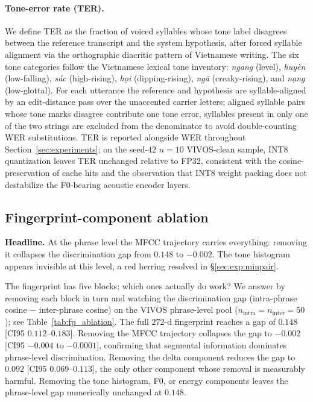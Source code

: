 \documentclass[a4paper,fleqn]{cas-dc}
\begin{document}
\paragraph{Tone-error rate (TER).} We define TER as the fraction of voiced syllables whose tone label disagrees between the reference transcript and the system hypothesis, after forced syllable alignment via the orthographic diacritic pattern of Vietnamese writing. The six tone categories follow the Vietnamese lexical tone inventory: \emph{ngang} (level), \emph{huy\`en} (low-falling), \emph{s\'ac} (high-rising), \emph{h\d{o}i} (dipping-rising), \emph{ng\~a} (creaky-rising), and \emph{n\d{a}ng} (low-glottal). For each utterance the reference and hypothesis are syllable-aligned by an edit-distance pass over the unaccented carrier letters; aligned syllable pairs whose tone marks disagree contribute one tone error, syllables present in only one of the two strings are excluded from the denominator to avoid double-counting WER substitutions. TER is reported alongside WER throughout Section~\ref{sec:experiments}; on the seed-$42$ $n=10$ VIVOS-clean sample, INT8 quantization leaves TER unchanged relative to FP32, consistent with the cosine-preservation of cache hits and the observation that INT8 weight packing does not destabilize the F0-bearing acoustic encoder layers.

\subsection{Fingerprint-component ablation}\label{sec:exp:ablation}
\textbf{Headline.} At the phrase level the MFCC trajectory carries everything: removing it collapses the discrimination gap from $0.148$ to $-0.002$. The tone histogram appears invisible at this level, a red herring resolved in \S\ref{sec:exp:minpair}.

The fingerprint has five blocks; which ones actually do work? We answer by removing each block in turn and watching the discrimination gap (intra-phrase cosine $-$ inter-phrase cosine) on the VIVOS phrase-level pool ($n_{\textrm{intra}} = n_{\textrm{inter}} = 50$); see Table~\ref{tab:fp_ablation}. The full $272$-d fingerprint reaches a gap of \textbf{$0.148$} [CI95 $0.112$--$0.183$]. Removing the MFCC trajectory collapses the gap to $-0.002$ [CI95 $-0.004$ to $-0.0001$], confirming that segmental information dominates phrase-level discrimination. Removing the delta component reduces the gap to $0.092$ [CI95 $0.069$--$0.113$], the only other component whose removal is measurably harmful. Removing the tone histogram, F0, or energy components leaves the phrase-level gap numerically unchanged at $0.148$.
\end{document}
